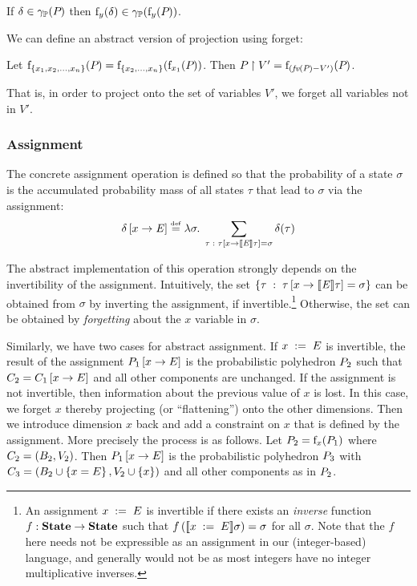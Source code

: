 \begin{lemma}
\label{lem:pp:forget}
If $\delta \in \gamma_{\mathbb{P}}(P_{})$ then $\mathrm{f}_{y}(\delta) \in
\gamma_{\mathbb{P}}(\mathrm{f}_{y}(P_{}))$.
\end{lemma}
\noindent
We can define an abstract version of projection using forget:
\begin{definition}
Let $\mathrm{f}_{\{x_1,x_2,\ldots,x_n\}}(P_{}) =
\mathrm{f}_{\{x_2,\ldots,x_n\}}(\mathrm{f}_{x_1}(P_{}))$.  Then
$P_{} \upharpoonright V' = \mathrm{f}_{(\textit{fv}(P_{}) - V')}(P_{})$. 
\end{definition}
That is, in order to project onto the set of variables $V'$, we forget
all variables not in $V'$.

\subsubsection{Assignment}
The concrete assignment operation is defined so that the probability
of a state $ \sigma $ is the accumulated probability mass of all
states $ \tau $ that lead to $ \sigma $ via the assignment:
$$ \delta \left[ x \rightarrow \mathit{E} \right] \stackrel{\smash{\scriptscriptstyle \mathrm{def}}}= \lambda \sigma . \; \sum_{\tau \;:\; \tau
  \left[ x \rightarrow [\![{\mathit{E}}]\!]{\tau} \right] = \sigma} \delta (\tau) $$

The abstract implementation of this operation strongly depends on the
invertibility of the assignment. Intuitively, the set $ \left\{ \tau
  \;:\; \tau \left[ x \rightarrow [\![{\mathit{E}}]\!]{\tau} \right]=\sigma \right\} $ can be
obtained from $ \sigma $ by inverting the assignment, if
invertible.\footnote{An assignment $
  {x}\;:=\;{E} $ is invertible if there exists an \emph{inverse}
  function $ f:\textbf{State} \rightarrow \textbf{State} $ such that $
  f\left( [\![{{x}\;:=\;{E}}]\!]{\sigma} \right) = \sigma $ for all
  $\sigma$. Note that the $ f $ here needs not be expressible as an
  assignment in our (integer-based) language, and generally would not
  be as most integers have no integer multiplicative
  inverses.} Otherwise, the set can be obtained by \emph{forgetting}
about the $ x $ variable in $ \sigma $.

Similarly, we have two cases for abstract assignment. If
${x}\;:=\;{E}$ is invertible, the result of the
assignment $P_{1} \left[ x \rightarrow E \right]$ is the probabilistic polyhedron
$P_{2}$ such that $C_{2} = C_{1} \left[ x \rightarrow E \right]$ and
all other components are unchanged.
%
If the assignment is not invertible, then information about the
previous value of $x$ is lost.  In this case, we forget $ x $ thereby
projecting (or ``flattening'') onto the other dimensions. Then we
introduce dimension $ x $ back and add a constraint on $x$ that is
defined by the assignment. More precisely the process is as
follows. Let $P_{2} = \mathrm{f}_{x}(P_{1})$ where $C_2 = (B_2,
V_2)$.  Then $P_{1} \left[ x \rightarrow E \right]$ is the probabilistic polyhedron
$P_{3}$ with $ C_3 = (B_2 \cup \left\{ x = E \right\}, V_2 \cup
\left\{ x \right\})$ and all other components as in $P_{2}$.

